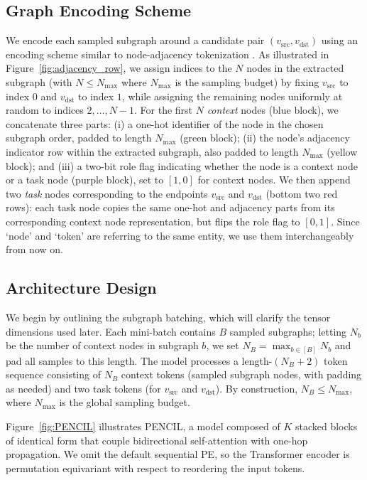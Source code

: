 \documentclass{article}
\theoremstyle{plain}
\theoremstyle{definition}
\theoremstyle{remark}
\begin{document}
\subsection{Graph Encoding Scheme}
We encode each sampled subgraph around a candidate pair $(v_{\text{src}}, v_{\text{dst}})$ using an encoding scheme similar to node-adjacency tokenization \cite{yehudai_depth-width_2025}. As illustrated in Figure~\ref{fig:adjacency_row}, we assign indices to the $N$ nodes in the extracted subgraph (with $N \le N_{\max}$ where $N_{\max}$ is the sampling budget) by fixing $v_{\text{src}}$ to index $0$ and $v_{\text{dst}}$ to index $1$, while assigning the remaining nodes uniformly at random to indices $2,\ldots,N-1$. For the first $N$ \emph{context} nodes (blue block), we concatenate three parts: (i) a one-hot identifier of the node in the chosen subgraph order, padded to length $N_{\max}$ (green block); (ii) the node's adjacency indicator row within the extracted subgraph, also padded to length $N_{\max}$ (yellow block); and (iii) a two-bit role flag indicating whether the node is a context node or a task node (purple block), set to $[1,0]$ for context nodes. We then append two \emph{task} nodes corresponding to the endpoints $v_{\text{src}}$ and $v_{\text{dst}}$ (bottom two red rows): each task node copies the same one-hot and adjacency parts from its corresponding context node representation, but flips the role flag to $[0,1]$. Since `node' and `token' are referring to the same entity, we use them interchangeably from now on.

\subsection{Architecture Design} \label{sec:architectural-details}

We begin by outlining the subgraph batching, which will clarify the tensor dimensions used later. Each mini-batch contains $B$ sampled subgraphs; letting $N_b$ be the number of context nodes in subgraph $b$, we set $N_B=\max_{b\in[B]} N_b$ and pad all samples to this length. The model processes a length-$(N_B+2)$ token sequence consisting of $N_B$ context tokens (sampled subgraph nodes, with padding as needed) and two task tokens (for $v_{\text{src}}$ and $v_{\text{dst}}$). By construction, $N_B \le N_{\max}$, where $N_{\max}$ is the global sampling budget. 

Figure~\ref{fig:PENCIL} illustrates PENCIL, a model composed of $K$ stacked blocks of identical form that couple bidirectional self-attention with one-hop propagation. We omit the default sequential PE, so the Transformer encoder is permutation equivariant with respect to reordering the input tokens. 
\end{document}
